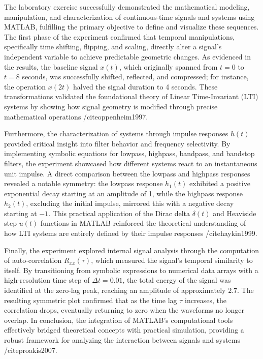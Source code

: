 The laboratory exercise successfully demonstrated the mathematical modeling, manipulation, and characterization of continuous-time signals and systems using MATLAB, fulfilling the primary objective to define and visualize these sequences. The first phase of the experiment confirmed that temporal manipulations, specifically time shifting, flipping, and scaling, directly alter a signal's independent variable to achieve predictable geometric changes. As evidenced in the results, the baseline signal $x(t)$, which originally spanned from $t = 0$ to $t = 8$ seconds, was successfully shifted, reflected, and compressed; for instance, the operation $x(2t)$ halved the signal duration to 4 seconds. These transformations validated the foundational theory of Linear Time-Invariant (LTI) systems by showing how signal geometry is modified through precise mathematical operations /cite{oppenheim1997}.

Furthermore, the characterization of systems through impulse responses $h(t)$ provided critical insight into filter behavior and frequency selectivity. By implementing symbolic equations for lowpass, highpass, bandpass, and bandstop filters, the experiment showcased how different systems react to an instantaneous unit impulse. A direct comparison between the lowpass and highpass responses revealed a notable symmetry: the lowpass response $h_1(t)$ exhibited a positive exponential decay starting at an amplitude of 1, while the highpass response $h_2(t)$, excluding the initial impulse, mirrored this with a negative decay starting at $-1$. This practical application of the Dirac delta $\delta(t)$ and Heaviside step $u(t)$ functions in MATLAB reinforced the theoretical understanding of how LTI systems are entirely defined by their impulse responses /cite{haykin1999}.

Finally, the experiment explored internal signal analysis through the computation of auto-correlation $R_{xx}(\tau)$, which measured the signal’s temporal similarity to itself. By transitioning from symbolic expressions to numerical data arrays with a high-resolution time step of $\Delta t = 0.01$, the total energy of the signal was identified at the zero-lag peak, reaching an amplitude of approximately $2.7$. The resulting symmetric plot confirmed that as the time lag $\tau$ increases, the correlation drops, eventually returning to zero when the waveforms no longer overlap. In conclusion, the integration of MATLAB's computational tools effectively bridged theoretical concepts with practical simulation, providing a robust framework for analyzing the interaction between signals and systems /cite{proakis2007}.

